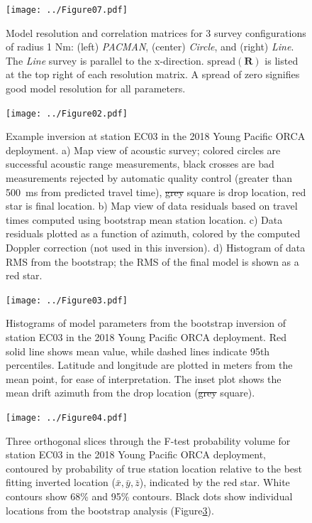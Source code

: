 \documentclass[10pt,titlepage]{article}
\providecommand{\DIFaddtex}[1]{{\protect\color{blue}\uwave{#1}}} %
\providecommand{\DIFdeltex}[1]{{\protect\color{red}\sout{#1}}}                      %
\providecommand{\DIFaddFL}[1]{\DIFadd{#1}} %
\providecommand{\DIFdelFL}[1]{\DIFdel{#1}} %
\providecommand{\DIFaddbeginFL}{} %
\providecommand{\DIFaddendFL}{} %
\providecommand{\DIFdelbeginFL}{} %
\providecommand{\DIFdelendFL}{} %
\providecommand{\DIFadd}[1]{\texorpdfstring{\DIFaddtex{#1}}{#1}} %
\providecommand{\DIFdel}[1]{\texorpdfstring{\DIFdeltex{#1}}{}} %
\begin{document}
\begin{figure}
[h]
\texttt{[image: ../Figure07.pdf]}
\caption{ Model resolution and correlation matrices for 3 survey configurations of radius 1 Nm: (left) \textit{PACMAN}, (center) \textit{Circle}, and (right) \textit{Line}. The \textit{Line} survey is parallel to the x-direction. $\text{spread}(\mathbf{R})$ is listed at the top right of each resolution matrix. A spread of zero signifies good model resolution for all parameters.}
\label{fig:resolution_correlation}
\end{figure}
\newpage

\begin{figure}
[h]
\texttt{[image: ../Figure02.pdf]}
\caption{Example inversion at station EC03 in the 2018 Young Pacific ORCA deployment. a) Map view of acoustic survey; colored circles are successful acoustic range measurements, black crosses are bad measurements rejected by automatic quality control (greater than 500~ms from predicted travel time), \DIFdelbeginFL \DIFdelFL{grey }\DIFdelendFL \DIFaddbeginFL \DIFaddFL{gray }\DIFaddendFL square is drop location, red star is final location. b) Map view of data residuals based on travel times computed using bootstrap mean station location. c) Data residuals plotted as a function of azimuth, colored by the computed Doppler correction (not used in this inversion). d) Histogram of data RMS from the bootstrap; the RMS of the final model is shown as a red star.}
\label{fig:one_sta_real_survey}
\end{figure}
\newpage

\begin{figure}
[h]
\texttt{[image: ../Figure03.pdf]}
\caption{Histograms of model parameters from the bootstrap inversion of station EC03 in the 2018 Young Pacific ORCA deployment. Red solid line shows mean value, while dashed lines indicate 95th percentiles. Latitude and longitude are plotted in meters from the mean point, for ease of interpretation. The inset plot shows the mean drift azimuth from the drop location (\DIFdelbeginFL \DIFdelFL{grey }\DIFdelendFL \DIFaddbeginFL \DIFaddFL{gray }\DIFaddendFL square).}
\label{fig:one_sta_real_histograms}
\end{figure}
\newpage

\begin{figure}
[h]
\texttt{[image: ../Figure04.pdf]}
\caption{ Three orthogonal slices through the F-test probability volume for station EC03 in the 2018 Young Pacific ORCA deployment, contoured by probability of true station location relative to the best fitting inverted location ($\bar{x},\bar{y},\bar{z}$), indicated by the red star. White contours show 68\% and 95\% contours. Black dots show individual locations from the bootstrap analysis (Figure\DIFaddbeginFL \DIFaddFL{~}\DIFaddendFL \ref{fig:one_sta_real_histograms}).}
\label{fig:one_sta_real_ftests}
\end{figure}
\newpage
\end{document}
